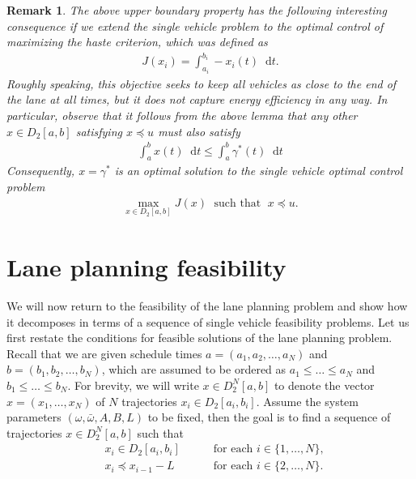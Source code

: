 \documentclass[a4paper]{report}
\theoremstyle{definition}
\theoremstyle{plain}
\newtheorem*{remark}{Remark}
\newcommand*\diff{\mathop{}\!\mathrm{d}}
\begin{document}
\begin{remark}
  The above upper boundary property has the following interesting consequence if
  we extend the single vehicle problem to the optimal control of maximizing the
  haste criterion, which was defined as
  \begin{align}\label{eq:haste-objective}
  J(x_{i}) = \int_{a_{i}}^{b_{i}} - x_{i}(t) \diff t .
  \end{align}
  Roughly speaking, this objective seeks to keep all vehicles as close to the end
  of the lane at all times, but it does not capture energy efficiency in any way.
  In particular, observe that it follows from the above lemma that any other
  $x \in D_{2}[a,b]$ satisfying $x \preceq u$ must also satisfy
  \begin{align}
    \int_{a}^{b} x(t) \diff t \leq \int_{a}^{b} \gamma^{*}(t) \diff t
  \end{align}
  Consequently, $x = \gamma^{*}$ is an optimal solution to the single vehicle
  optimal control problem
  \begin{align}
    \max_{x \in D_{2}[a,b]} J(x) \; \text{ such that } \; x \preceq u .
  \end{align}

\end{remark}


\section{Lane planning feasibility}\label{sec:lane-problem-feasibility}

We will now return to the feasibility of the lane planning problem and show how
it decomposes in terms of a sequence of single vehicle feasibility problems.
%
Let us first restate the conditions for feasible solutions of the lane planning
problem.
%
Recall that we are given schedule times $a = (a_{1}, a_{2}, \dots, a_{N})$ and
$b = (b_{1}, b_{2}, \dots, b_{N})$, which are assumed to be ordered as
$a_{1} \leq \dots \leq a_{N}$ and
$b_{1} \leq \dots \leq b_{N}$.
%
For brevity, we will write $x \in D_{2}^{N}[a, b]$ to denote the vector
$x = (x_{1}, \dots, x_{N})$ of $N$ trajectories $x_{i} \in D_{2}[a_{i},b_{i}]$.
%
Assume the system parameters $(\omega, \bar{\omega},A,B,L)$ to be fixed, then
the goal is to find a sequence of trajectories $x \in D_{2}^{N}[a,b]$ such that
\begin{subequations}
\begin{alignat}{2}
  &x_{i} \in D_2[a_{i},b_{i}] && \quad \text{ for each } i \in \{1, \dots, N\} , \\
  &x_{i} \preceq x_{i-1} - L && \quad \text{ for each } i \in \{2, \dots, N\} . \label{eq:follow-constraint}
\end{alignat}
\end{subequations}
\end{document}
